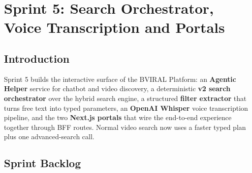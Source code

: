 \chapter{Sprint 5: Search Orchestrator, Voice Transcription and Portals}

\section*{Introduction}

Sprint 5 builds the interactive surface of the BVIRAL Platform: an \textbf{Agentic Helper}
service for chatbot and video discovery, a deterministic \textbf{v2 search orchestrator} over
the hybrid search engine, a structured \textbf{filter extractor} that turns free text into typed
parameters, an \textbf{OpenAI Whisper} voice transcription pipeline, and the two \textbf{Next.js
portals} that wire the end-to-end experience together through BFF routes. Normal video search now
uses a faster typed plan plus one advanced-search call.

\section{Sprint Backlog}

